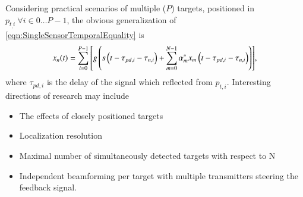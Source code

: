 Considering practical scenarios of multiple ($P$) targets, positioned in $p_{t_,i}\ \forall i\in0\dots{}P-1$, the obvious generalization of \eqref{eqn:SingleSensorTemporalEquality} is 
\begin{equation}
    \label{eqn:ftr_dyn_temp}
    x_{n}(t) = \sum_{i=0}^{P-1}{\left[{g\left({s\left({t-\tau_{pd,i}-\tau_{n,i}}\right)
    +\sum_{m=0}^{N-1}{\alpha^{*}_{m}x_{m}\left({t-\tau_{pd,i}-\tau_{n,i}}\right)}}\right)}\right]},
\end{equation}
where $\tau_{pd,i}$ is the delay of the signal which reflected from $p_{t,i}$.
Interesting directions of research may include
\begin{itemize}
    \item The effects of closely positioned targets
    \item Localization resolution
    \item Maximal number of simultaneously detected targets with respect to N
    \item Independent beamforming per target with multiple transmitters steering the feedback signal. 
\end{itemize}